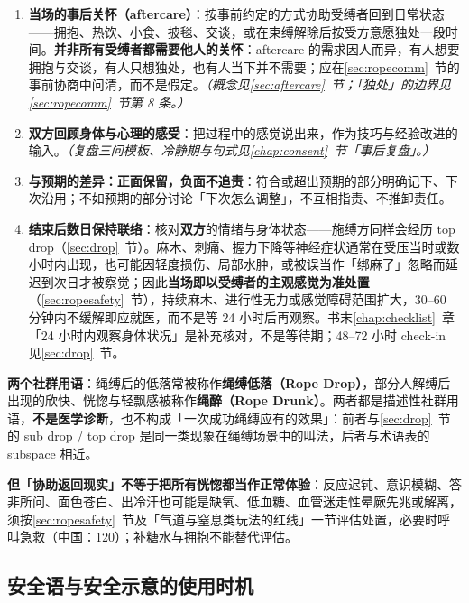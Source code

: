 \documentclass[12pt,UTF8]{ctexbook}
\begin{document}
\begin{enumerate}
\item \textbf{当场的事后关怀（aftercare）}：按事前约定的方式协助受缚者回到日常状态——拥抱、热饮、小食、披毯、交谈，或在束缚解除后按受方意愿独处一段时间。\textbf{并非所有受缚者都需要他人的关怀}：aftercare 的需求因人而异，有人想要拥抱与交谈，有人只想独处，也有人当下并不需要；应在\ref{sec:ropecomm}~节的事前协商中问清，而不是假定。\textit{（概念见\ref{sec:aftercare}~节；「独处」的边界见\ref{sec:ropecomm}~节第 8 条。）}
\item \textbf{双方回顾身体与心理的感受}：把过程中的感觉说出来，作为技巧与经验改进的输入。\textit{（复盘三问模板、冷静期与句式见\ref{chap:consent}~节「事后复盘」。）}
\item \textbf{与预期的差异：正面保留，负面不追责}：符合或超出预期的部分明确记下、下次沿用；不如预期的部分讨论「下次怎么调整」，不互相指责、不推卸责任。
\item \textbf{结束后数日保持联络}：核对\textbf{双方}的情绪与身体状态——施缚方同样会经历 top drop（\ref{sec:drop}~节）。麻木、刺痛、握力下降等神经症状通常在受压当时或数小时内出现，也可能因轻度损伤、局部水肿，或被误当作「绑麻了」忽略而延迟到次日才被察觉；因此\textbf{当场即以受缚者的主观感觉为准处置}（\ref{sec:ropesafety}~节），持续麻木、进行性无力或感觉障碍范围扩大，30--60 分钟内不缓解即应就医，而不是等 24 小时后再观察。书末\ref{chap:checklist}~章「24 小时内观察身体状况」是补充核对，不是等待期；48--72 小时 check-in 见\ref{sec:drop}~节。
\end{enumerate}

\noindent\textbf{两个社群用语}：绳缚后的低落常被称作\textbf{绳缚低落（Rope Drop）}，部分人解缚后出现的欣快、恍惚与轻飘感被称作\textbf{绳醉（Rope Drunk）}。两者都是描述性社群用语，\textbf{不是医学诊断}，也不构成「一次成功绳缚应有的效果」：前者与\ref{sec:drop}~节的 sub drop / top drop 是同一类现象在绳缚场景中的叫法，后者与术语表的 subspace 相近。

\noindent\textbf{但「协助返回现实」不等于把所有恍惚都当作正常体验}：反应迟钝、意识模糊、答非所问、面色苍白、出冷汗也可能是缺氧、低血糖、血管迷走性晕厥先兆或解离，须按\ref{sec:ropesafety}~节及「气道与窒息类玩法的红线」一节评估处置，必要时呼叫急救（中国：120）；补糖水与拥抱不能替代评估。

\subsection{安全语与安全示意的使用时机}\label{sec:ropesafeword}
\end{document}
